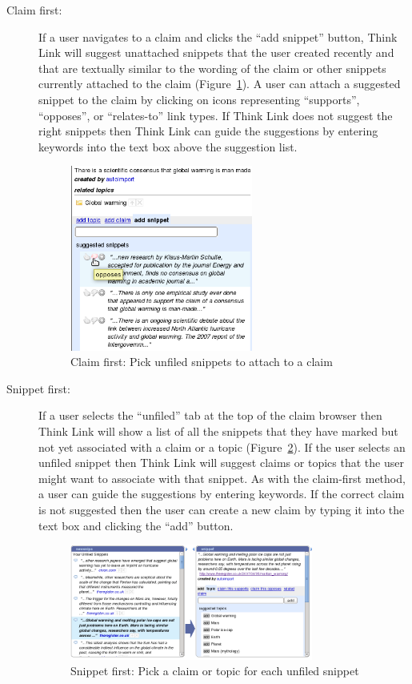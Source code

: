 \documentclass{chi2009}
\newcommand{\todo}[1]{}
\begin{document}
\begin{description}
\item[Claim first:] If a user navigates to a claim and clicks the ``add snippet'' button, Think Link will suggest unattached snippets that the user created recently and that are textually similar to the wording of the claim or other snippets currently attached to the claim (Figure~\ref{snipclaim}). A user can attach a suggested snippet to the claim by clicking on icons representing ``supports'', ``opposes'', or ``relates-to'' link types. If Think Link does not suggest the right snippets then Think Link can guide the suggestions by entering keywords into the text box above the suggestion list.

\begin{figure}[tb]
	\begin{center}
	\includegraphics[width=6cm]{../screenshots/v2_sugsnippet.png}
	\caption{Claim first: Pick unfiled snippets to attach to a claim}
	\label{snipclaim}
	\end{center}
\end{figure}

\item[Snippet first:] If a user selects the ``unfiled'' tab at the top of the claim browser then Think Link will show a list of all the snippets that they have marked but not yet associated with a claim or a topic (Figure~\ref{sniptopic}). If the user selects an unfiled snippet then Think Link will suggest claims or topics that the user might want to associate with that snippet. As with the claim-first method, a user can guide the suggestions by entering keywords. If the correct claim is not suggested then the user can create a new claim by typing it into the text box and clicking the ``add'' button.

\todo{Updated screenshot with ``enter new claim or search keywords'' present}

\begin{figure}[tb]
	\begin{center}
	\includegraphics[width=8cm]{../screenshots/v2_sniptopic.png}
	\caption{Snippet first: Pick a claim or topic for each unfiled snippet}
	\label{sniptopic}
	\end{center}
\end{figure}


\end{description}
\end{document}
